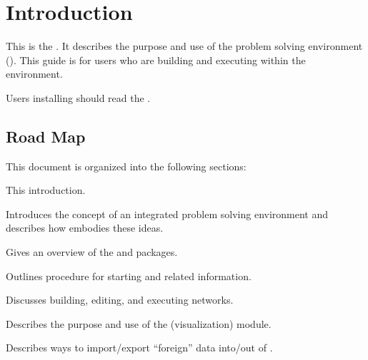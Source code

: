 %
%
%
%
%

%

\chapter{Introduction}
\label{ch:intro}


This is the \etitle{\srug}.  It describes the purpose and use of the
\sr{} problem solving environment (\pse).  This guide is for users who
are building and executing  within the \sr{}
environment.

Users installing \sr{} should read the
.




\section{Road Map}
\label{sec:roadmap}

This document is organized into the following sections:

\begin{description}
   This introduction.
  
   Introduces the concept of
  an integrated problem solving environment and describes how \SR{}
  embodies these ideas.
  
   Gives an overview
  of the \sr{} and \biopse{} packages.
  
   Outlines procedure
  for starting \sr{} and related information.

  Discusses building, editing, and executing
  networks.

  Describes the purpose and use of the \viewer{} (visualization) module.

  Describes ways to import/export ``foreign'' data into/out of \SR{}.
\end{description}


